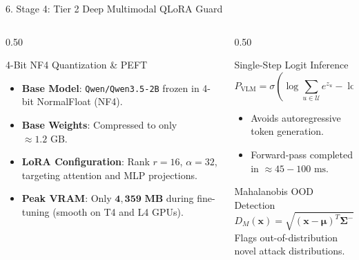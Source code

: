 \documentclass[aspectratio=169, 10pt]{beamer}
\begin{document}
\begin{frame}{6. Stage 4: Tier 2 Deep Multimodal QLoRA Guard}
    \begin{columns}[T]
        \begin{column}{0.50\textwidth}
            \begin{block}{4-Bit NF4 Quantization \& PEFT}
                \begin{itemize}
                    \item \textbf{Base Model}: \texttt{Qwen/Qwen3.5-2B} frozen in 4-bit NormalFloat (NF4).
                    \item \textbf{Base Weights}: Compressed to only $\approx 1.2\text{ GB}$.
                    \item \textbf{LoRA Configuration}: Rank $r=16$, $\alpha=32$, targeting attention and MLP projections.
                    \item \textbf{Peak VRAM}: Only $\mathbf{4,359\text{ MB}}$ during fine-tuning (smooth on T4 and L4 GPUs).
                \end{itemize}
            \end{block}
        \end{column}
        \begin{column}{0.50\textwidth}
            \begin{block}{Single-Step Logit Inference}
                $$P_{\text{VLM}} = \sigma\left(\log \sum_{u \in \mathcal{U}} e^{z_u} - \log \sum_{s \in \mathcal{S}} e^{z_s}\right)$$
                \begin{itemize}
                    \item Avoids autoregressive token generation.
                    \item Forward-pass completed in $\approx 45-100\text{ ms}$.
                \end{itemize}
            \end{block}
            \begin{block}{Mahalanobis OOD Detection}
                $$D_M(\mathbf{x}) = \sqrt{(\mathbf{x} - \boldsymbol{\mu})^T \boldsymbol{\Sigma}^{-1} (\mathbf{x} - \boldsymbol{\mu})}$$
                Flags out-of-distribution novel attack distributions.
            \end{block}
        \end{column}
    \end{columns}
\end{frame}
\end{document}
